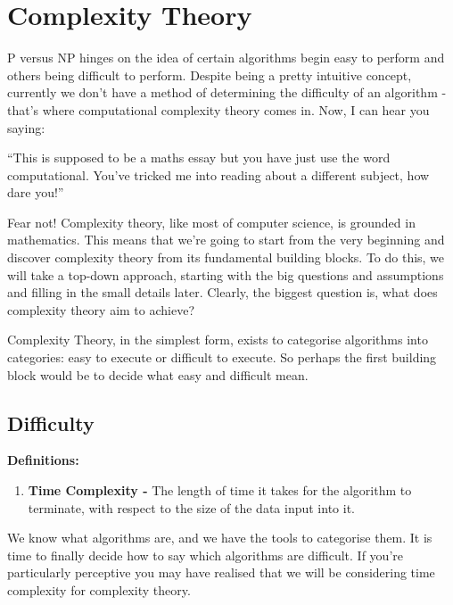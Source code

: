 \documentclass[twoside,10pt]{article}
\begin{document}
\section{Complexity Theory}
P versus NP hinges on the idea of certain algorithms begin easy to perform and others being difficult to perform. Despite being a pretty intuitive concept, currently we don't have a method of determining the difficulty of an algorithm - that's where computational complexity theory comes in. Now, I can hear you saying:

``This is supposed to be a maths essay but you have just use the word computational. You've tricked me into reading about a different subject, how dare you!''

Fear not! Complexity theory, like most of computer science, is grounded in mathematics. This means that we're going to start from the very beginning and discover complexity theory from its fundamental building blocks. To do this, we will take a top-down approach, starting with the big questions and assumptions and filling in the small details later. Clearly, the biggest question is, what does complexity theory aim to achieve? 

Complexity Theory, in the simplest form, exists to categorise algorithms into categories: easy to execute or difficult to execute. So perhaps the first building block would be to decide what easy and difficult mean.

\subsection{Difficulty}
\textbf{Definitions:}
\begin{enumerate}
    \item \textbf{Time Complexity -} The length of time it takes for the algorithm to terminate, with respect to the size of the data input into it.
\end{enumerate}
We know what algorithms are, and we have the tools to categorise them. It is time to finally decide how to say which algorithms are difficult. If you're particularly perceptive you may have realised that we will be considering time complexity for complexity theory.
\end{document}
